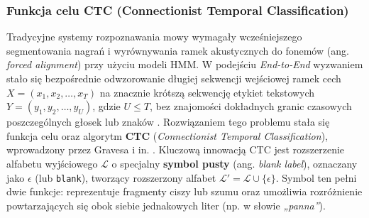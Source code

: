 \subsubsection{Funkcja celu CTC (Connectionist Temporal Classification)}
\label{subsec:ctc} Tradycyjne systemy rozpoznawania mowy wymagały wcześniejszego segmentowania nagrań i wyrównywania ramek akustycznych do fonemów (ang. \textit{forced alignment}) przy użyciu modeli HMM. W podejściu \textit{End-to-End} wyzwaniem stało się bezpośrednie odwzorowanie długiej sekwencji wejściowej ramek cech $X = (x_1, x_2, \dots, x_T)$ na znacznie krótszą sekwencję etykiet tekstowych $Y = (y_1, y_2, \dots, y_U)$, gdzie $U \le T$, bez znajomości dokładnych granic czasowych poszczególnych głosek lub znaków \cite[s.~1]{graves2006ctc}. Rozwiązaniem tego problemu stała się funkcja celu oraz algorytm \textbf{CTC} (\textit{Connectionist Temporal Classification}), wprowadzony przez Gravesa i in. \cite{graves2006ctc}. Kluczową innowacją CTC jest rozszerzenie alfabetu wyjściowego $\mathcal{L}$ o specjalny \textbf{symbol pusty} (ang. \textit{blank label}), oznaczany jako $\epsilon$ (lub \texttt{blank}), tworzący rozszerzony alfabet $\mathcal{L}' = \mathcal{L} \cup \{\epsilon\}$. Symbol ten pełni dwie funkcje: reprezentuje fragmenty ciszy lub szumu oraz umożliwia rozróżnienie powtarzających się obok siebie jednakowych liter (np. w słowie \textit{„panna”}).

